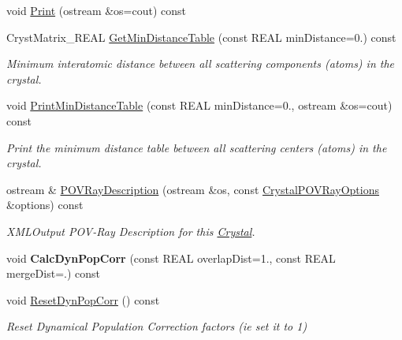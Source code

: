 \begin{DoxyCompactItemize}
void \mbox{\hyperlink{class_obj_cryst_1_1_crystal_a086f39272ca94c23ff7819151a9edf37}{Print}} (ostream \&os=cout) const
\item 
Cryst\+Matrix\+\_\+\+R\+E\+AL \mbox{\hyperlink{class_obj_cryst_1_1_crystal_a26c8dfab558f79522c3ab31babd4720e}{Get\+Min\+Distance\+Table}} (const R\+E\+AL min\+Distance=0.) const
\begin{DoxyCompactList}\small\item\em Minimum interatomic distance between all scattering components (atoms) in the crystal. \end{DoxyCompactList}\item 
void \mbox{\hyperlink{class_obj_cryst_1_1_crystal_a483003d7cfbd4bc0027615f1bc2e9f39}{Print\+Min\+Distance\+Table}} (const R\+E\+AL min\+Distance=0., ostream \&os=cout) const
\begin{DoxyCompactList}\small\item\em Print the minimum distance table between all scattering centers (atoms) in the crystal. \end{DoxyCompactList}\item 
ostream \& \mbox{\hyperlink{class_obj_cryst_1_1_crystal_a1cdcbdf36f1a93e86d8e56270ac817ad}{P\+O\+V\+Ray\+Description}} (ostream \&os, const \mbox{\hyperlink{struct_obj_cryst_1_1_crystal_p_o_v_ray_options}{Crystal\+P\+O\+V\+Ray\+Options}} \&options) const
\begin{DoxyCompactList}\small\item\em X\+M\+L\+Output P\+O\+V-\/\+Ray Description for this \mbox{\hyperlink{class_obj_cryst_1_1_crystal}{Crystal}}. \end{DoxyCompactList}\item 
\mbox{\label{class_obj_cryst_1_1_crystal_ae52864c0b36def5ffa750cd9cf128799}} 
void {\bfseries Calc\+Dyn\+Pop\+Corr} (const R\+E\+AL overlap\+Dist=1., const R\+E\+AL merge\+Dist=.) const
\item 
\mbox{\label{class_obj_cryst_1_1_crystal_a003ff86924120b77365f8e129fde87f2}} 
void \mbox{\hyperlink{class_obj_cryst_1_1_crystal_a003ff86924120b77365f8e129fde87f2}{Reset\+Dyn\+Pop\+Corr}} () const
\begin{DoxyCompactList}\small\item\em Reset Dynamical Population Correction factors (ie set it to 1) \end{DoxyCompactList}\item 

\end{DoxyCompactItemize}
